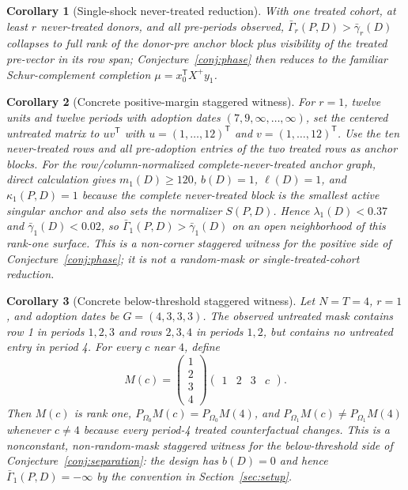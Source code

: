 \documentclass[11pt]{article}
\newcommand{\transpose}{\mathsf{T}}
\theoremstyle{definition}
\theoremstyle{plain}
\newtheorem{corollary}{Corollary}
\theoremstyle{remark}
\begin{document}
\begin{corollary}[Single-shock never-treated reduction]\label{cor:single}
With one treated cohort, at least $r$ never-treated donors, and all pre-periods
observed, $\bar\Gamma_r(P,D)>\bar\gamma_r(D)$ collapses to full rank of the
donor-pre anchor block plus visibility of the treated pre-vector in its row
span; Conjecture~\ref{conj:phase} then reduces to the familiar Schur-complement
completion $\mu=x_0^\transpose X^+ y_1$.
\end{corollary}

\begin{corollary}[Concrete positive-margin staggered witness]\label{cor:witness}
For $r=1$, twelve units and twelve periods with adoption dates
$(7,9,\infty,\ldots,\infty)$, set the centered untreated matrix to
$u v^\transpose$ with $u=(1,\ldots,12)^\transpose$ and
$v=(1,\ldots,12)^\transpose$. Use the ten never-treated rows and all
pre-adoption entries of the two treated rows as anchor blocks. For the
row/column-normalized complete-never-treated anchor graph, direct calculation
gives $m_1(D)\ge 120$, $b(D)=1$, $\ell(D)=1$, and
$\kappa_1(P,D)=1$ because the complete never-treated block is the smallest
active singular anchor and also sets the normalizer $S(P,D)$. Hence
$\lambda_1(D)<0.37$ and $\bar\gamma_1(D)<0.02$, so
$\bar\Gamma_1(P,D)>\bar\gamma_1(D)$ on an open neighborhood of this rank-one
surface. This is a non-corner staggered witness for the positive side of
Conjecture~\ref{conj:phase}; it is not a random-mask or single-treated-cohort
reduction.
\end{corollary}

\begin{corollary}[Concrete below-threshold staggered witness]\label{cor:belowwitness}
Let $N=T=4$, $r=1$, and adoption dates be $G=(4,3,3,3)$. The observed
untreated mask contains row 1 in periods $1,2,3$ and rows $2,3,4$ in periods
$1,2$, but contains no untreated entry in period 4. For every $c$ near $4$,
define
\[
M(c)=
\begin{pmatrix}
1\\2\\3\\4
\end{pmatrix}
\begin{pmatrix}
1&2&3&c
\end{pmatrix}.
\]
Then $M(c)$ is rank one, $P_{\Omega_0}M(c)=P_{\Omega_0}M(4)$, and
$P_{\Omega_1}M(c)\ne P_{\Omega_1}M(4)$ whenever $c\ne4$ because every
period-4 treated counterfactual changes. This is a nonconstant,
non-random-mask staggered witness for the below-threshold side of
Conjecture~\ref{conj:separation}: the design has $b(D)=0$ and hence
$\bar\Gamma_1(P,D)=-\infty$ by the convention in Section~\ref{sec:setup}.
\end{corollary}
\end{document}
